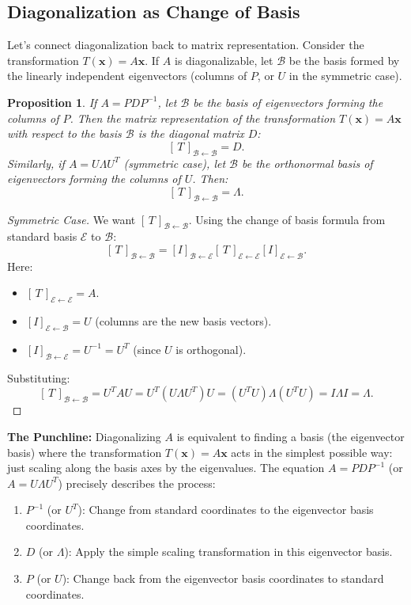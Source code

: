 \documentclass[11pt, a4paper]{article}
\theoremstyle{mytheoremstyle}
\newtheorem{proposition}[theorem]{Proposition}
\theoremstyle{mydefstyle}
\newcommand{\B}{\mathcal{B}}    %
\newcommand{\E}{\mathcal{E}}    %
\newcommand{\xb}{\mathbf{x}}     %
\newcommand{\matrixrep}[3]{[\,#1\,]_{\mathcal{#2} \leftarrow \mathcal{#3}}} %
\newcommand{\changebasis}[2]{[I]_{\mathcal{#1} \leftarrow \mathcal{#2}}} %
\begin{document}
\subsection{Diagonalization as Change of Basis}

Let's connect diagonalization back to matrix representation. Consider the transformation $T(\xb) = A\xb$. If $A$ is diagonalizable, let $\B$ be the basis formed by the linearly independent eigenvectors (columns of $P$, or $U$ in the symmetric case).

\begin{proposition}
If $A = P D P^{-1}$, let $\B$ be the basis of eigenvectors forming the columns of $P$. Then the matrix representation of the transformation $T(\xb)=A\xb$ with respect to the basis $\B$ is the diagonal matrix $D$:
\[ \matrixrep{T}{B}{B} = D. \]
Similarly, if $A = U \Lambda U^T$ (symmetric case), let $\B$ be the orthonormal basis of eigenvectors forming the columns of $U$. Then:
\[ \matrixrep{T}{B}{B} = \Lambda. \]
\end{proposition}

\begin{proof}[Symmetric Case]
We want $\matrixrep{T}{B}{B}$. Using the change of basis formula from standard basis $\E$ to $\B$:
\[ \matrixrep{T}{B}{B} = \changebasis{B}{E} \matrixrep{T}{E}{E} \changebasis{E}{B}. \]
Here:
\begin{itemize}
    \item $\matrixrep{T}{E}{E} = A$.
    \item $\changebasis{E}{B} = U$ (columns are the new basis vectors).
    \item $\changebasis{B}{E} = U^{-1} = U^T$ (since $U$ is orthogonal).
\end{itemize}
Substituting:
\[ \matrixrep{T}{B}{B} = U^T A U = U^T (U \Lambda U^T) U = (U^T U) \Lambda (U^T U) = I \Lambda I = \Lambda. \]
\end{proof}

\textbf{The Punchline:} Diagonalizing $A$ is equivalent to finding a basis (the eigenvector basis) where the transformation $T(\xb)=A\xb$ acts in the simplest possible way: just scaling along the basis axes by the eigenvalues. The equation $A = P D P^{-1}$ (or $A = U \Lambda U^T$) precisely describes the process:
\begin{enumerate}
    \item $P^{-1}$ (or $U^T$): Change from standard coordinates to the eigenvector basis coordinates.
    \item $D$ (or $\Lambda$): Apply the simple scaling transformation in this eigenvector basis.
    \item $P$ (or $U$): Change back from the eigenvector basis coordinates to standard coordinates.
\end{enumerate}
\end{document}
